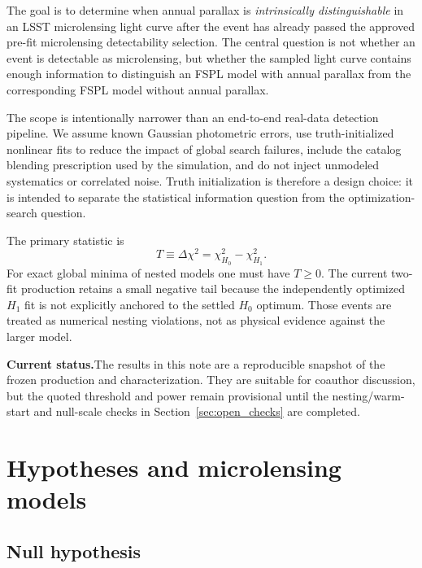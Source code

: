 \documentclass[11pt,a4paper]{article}
\newcommand{\dchi}{\Delta\chi^2}
\newcommand{\Hnull}{H_0}
\newcommand{\Halt}{H_1}
\newcommand{\statusbox}[2]{%
  \par\medskip
  \noindent\colorbox{gray!10}{%
    \parbox{0.96\linewidth}{\textbf{#1}\quad #2}%
  }%
  \par\medskip
}
\begin{document}
The goal is to determine when annual parallax is \emph{intrinsically distinguishable} in an
LSST microlensing light curve after the event has already passed the approved pre-fit
microlensing detectability selection.  The central question is not whether an event is
detectable as microlensing, but whether the sampled light curve contains enough information
to distinguish an FSPL model with annual parallax from the corresponding FSPL model without
annual parallax.

The scope is intentionally narrower than an end-to-end real-data detection pipeline.  We
assume known Gaussian photometric errors, use truth-initialized nonlinear fits to reduce the
impact of global search failures, include the catalog blending prescription used by the
simulation, and do not inject unmodeled systematics or correlated noise.  Truth initialization
is therefore a design choice: it is intended to separate the statistical information question
from the optimization-search question.

The primary statistic is
\begin{equation}
    T \equiv \dchi
    =
    \chi^2_{\Hnull}
    -
    \chi^2_{\Halt}.
\end{equation}
For exact global minima of nested models one must have $T\ge0$.  The current two-fit production
retains a small negative tail because the independently optimized $\Halt$ fit is not explicitly
anchored to the settled $\Hnull$ optimum.  Those events are treated as numerical nesting
violations, not as physical evidence against the larger model.

\statusbox{Current status.}{The results in this note are a reproducible snapshot of the frozen
production and characterization.  They are suitable for coauthor discussion, but the quoted
threshold and power remain provisional until the nesting/warm-start and null-scale checks in
Section~\ref{sec:open_checks} are completed.}

\section{Hypotheses and microlensing models}

\subsection{Null hypothesis}
\end{document}
